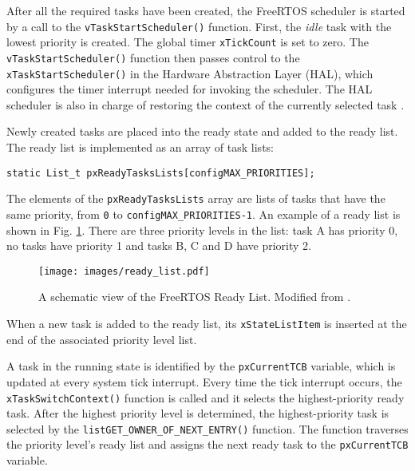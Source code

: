 After all the required tasks have been created, the FreeRTOS scheduler is started by a call to the 
\verb$vTaskStartScheduler()$ function. 
First, the \textit{idle} task with the lowest priority is created.
The global timer \verb$xTickCount$ is set to zero. 
The \verb$vTaskStartScheduler()$ function then passes control to the \verb$xTaskStartScheduler()$ in the Hardware Abstraction Layer (HAL), which configures the timer interrupt needed for invoking the scheduler. 
The HAL scheduler is also in charge of restoring the context of the currently selected task
\cite{goyette2007analysis}. 

Newly created tasks are placed into the ready state and added to the ready list. 
The ready list is implemented as an array of task lists:
\begin{lstlisting}[frame=none, label={lst:readylist}, caption={Ready task list}, captionpos=b]
static List_t pxReadyTasksLists[configMAX_PRIORITIES];
\end{lstlisting}
The elements of the \verb$pxReadyTasksLists$ array are lists of tasks that have the same priority, from \verb$0$ to \verb$configMAX_PRIORITIES-1$.
An example of a ready list is shown in Fig. \ref{freertos:ready}.
There are three priority levels in the list: task A has priority 0, no tasks have priority 1 and tasks B, C and D have priority 2. 
\begin{figure}[ht]
    \centering
    \texttt{[image: images/ready\_list.pdf]}
    \caption{A schematic view of the FreeRTOS Ready List. Modified from \cite{brown2012architecture}.}
    \label{freertos:ready}
\end{figure}
When a new task is added to the ready list, its \verb$xStateListItem$ is inserted at the end of the 
associated priority level list.

A task in the running state is identified by the \verb$pxCurrentTCB$ variable, which is updated at every system tick interrupt. 
Every time the tick interrupt occurs, the \verb$xTaskSwitchContext()$ function is called and it selects the highest-priority ready task.
After the highest priority level is determined,
the highest-priority task is selected by the \verb$listGET_OWNER_OF_NEXT_ENTRY()$ function.
The function traverses the priority level's ready list and assigns the next ready task to the \verb$pxCurrentTCB$ variable.

